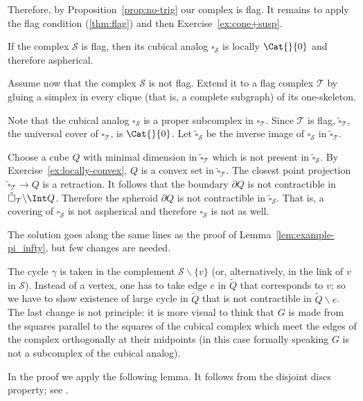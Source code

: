 Therefore, by Proposition~\ref{prop:no-trig} our complex is flag.
It remains to apply the flag condition (\ref{thm:flag}) and then Exercise~\ref{ex:cone+susp}.
\qeds

If the complex $\mathcal{S}$ is flag, then its cubical analog $\square_{\mathcal{S}}$ is locally $\Cat{}{0}$ and therefore aspherical.

Assume now that the complex $\mathcal{S}$ is not flag. 
Extend it to a flag complex $\mathcal{T}$ by gluing a simplex in every clique (that is, a complete subgraph) of its one-skeleton.

Note that the cubical analog $\square_{\mathcal{S}}$ is a proper subcomplex in $\square_{\mathcal{T}}$.
Since $\mathcal{T}$ is flag,
$\tilde\square_{\mathcal{T}}$,
the universal cover of $\square_{\mathcal{T}}$, is $\Cat{}{0}$.
Let $\tilde\square_{\mathcal{S}}$ be the inverse image of $\square_{\mathcal{S}}$ in $\tilde\square_{\mathcal{T}}$.

Choose a cube $Q$ with minimal dimension in $\tilde\square_{\mathcal{T}}$ which is not present in $\tilde\square_{\mathcal{S}}$.
By Exercise~\ref{ex:locally-convex}, $Q$ is a convex set in $\tilde\square_{\mathcal{T}}$.
The closest point projection $\tilde\square_{\mathcal{T}}\to Q$ is a retraction.
It follows that the boundary $\partial Q$ is not contractible in $\tilde\square_{\mathcal{T}}\backslash\Int Q$.
Therefore the spheroid $\partial Q$ is not contractible in $\tilde\square_{\mathcal{S}}$.
That is, a covering of $\square_{\mathcal{S}}$ is not aspherical and therefore $\square_{\mathcal{S}}$ is not as well.
\qeds

The solution goes along the same lines as the proof of Lemma~\ref{lem:example-pi_infty}, but few changes are needed.

The cycle $\gamma$ is taken in the complement $\mathcal{S}\backslash\{v\}$ (or, alternatively, in the link of $v$ in $\mathcal{S}$).
Instead of a vertex, one has to take edge $e$ in $\tilde Q$ that corresponds to $v$; so we have to show existence of large cycle in $\tilde Q$ that is not contractible in $\tilde Q\backslash e$.
The last change is not principle:
it is more visual to think that $G$ is made from the squares parallel to the squares of the cubical complex which meet the edges of the complex orthogonally at their midpoints (in this case formally speaking $G$ is not a subcomplex of the cubical analog).
\qeds

In the proof we apply the following lemma. 
It follows from the disjoint discs property;
see \cite{edwards, daverman}.

